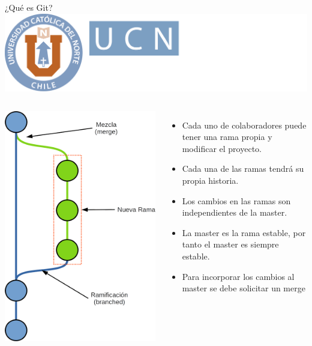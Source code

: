 \documentclass[12pt,a4paper,usenames,x11names,compress]{beamer}
\begin{document}
\begin{frame}{¿Qué es Git?\hfill \includegraphics[scale=.1]{eciem.png}}
\begin{columns}
\includegraphics[scale=.22]{commit_rama.png} 
\begin{itemize}
\justifying
 \item Cada uno de colaboradores puede tener una rama propia y modificar el proyecto.
 \item Cada una de las ramas tendrá su propia historia.
 \item Los cambios en las ramas son independientes de la master.
 \item La master es la rama estable, por tanto el master es siempre estable.
 \item Para incorporar los cambios al master se debe solicitar un merge
\end{itemize}
\end{columns}
\end{frame}
\end{document}
